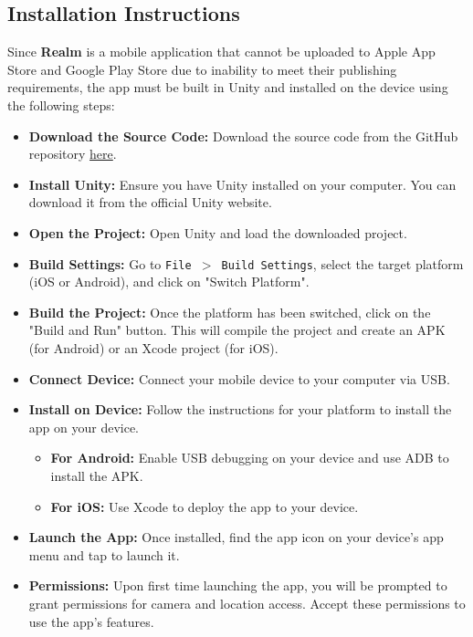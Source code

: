 \documentclass[12pt, titlepage]{article}
\newcommand{\progname}{Realm}
\begin{document}
\subsection{Installation Instructions}
Since \textbf{\progname} is a mobile application that cannot be uploaded to Apple App Store and Google Play Store due to inability to meet their publishing requirements, the app must be built in Unity and installed on the device using the following steps:
\begin{itemize}[leftmargin=*]
    \item \textbf{Download the Source Code:} Download the source code from the GitHub repository \href{https://github.com/russellrd/realm}{here}.
    \item \textbf{Install Unity:} Ensure you have Unity installed on your computer. You can download it from the official Unity website.
    \item \textbf{Open the Project:} Open Unity and load the downloaded project.
    \item \textbf{Build Settings:} Go to \texttt{File $>$ Build Settings}, select the target platform (iOS or Android), and click on "Switch Platform".
    \item \textbf{Build the Project:} Once the platform has been switched, click on the "Build and Run" button. This will compile the project and create an APK (for Android) or an Xcode project (for iOS).
    \item \textbf{Connect Device:} Connect your mobile device to your computer via USB.
    \item \textbf{Install on Device:} Follow the instructions for your platform to install the app on your device.
          \begin{itemize}[leftmargin=*]
              \item \textbf{For Android:} Enable USB debugging on your device and use ADB to install the APK.
              \item \textbf{For iOS:} Use Xcode to deploy the app to your device.
          \end{itemize}
    \item \textbf{Launch the App:} Once installed, find the app icon on your device's app menu and tap to launch it.
    \item \textbf{Permissions:} Upon first time launching the app, you will be prompted to grant permissions for camera and location access. Accept these permissions to use the app's features.
\end{itemize}
\end{document}
